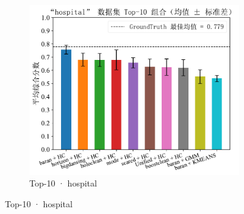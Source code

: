 \documentclass[10pt]{article} %
\numberwithin{equation}{section}
\begin{document}
\begin{figure}[htbp]
\begin{subfigure}{0.34\linewidth}
    \centering
    \includegraphics[width=\linewidth]{figures/5.3.1graph/top10_bar_error_hospital.pdf}
    \caption{Top-10 · hospital}
  \end{subfigure}


\end{figure}
\end{document}
